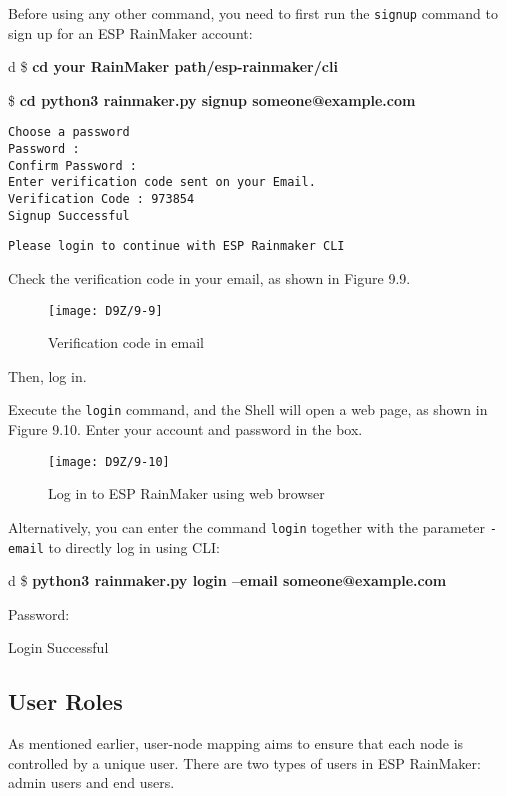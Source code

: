 \documentclass[a4paper,12pt]{book}
\begin{document}
Before using any other command, you need to first run the \verb|signup| command to sign up for an ESP RainMaker account:

\begin{codebloc}
\begin{tabular}{d}
\$ \textbf{cd {your RainMaker path}/esp-rainmaker/cli}

\$ \textbf{cd python3 rainmaker.py signup someone@example.com}
\begin{verbatim}
Choose a password
Password :
Confirm Password :
Enter verification code sent on your Email.
Verification Code : 973854
Signup Successful
\end{verbatim}
\verb|Please login to continue with ESP Rainmaker CLI|
\end{tabular}
\end{codebloc}

Check the verification code in your email, as shown in Figure 9.9.

\begin{figure}[!h]
    \centering
    \texttt{[image: D9Z/9-9]}
    \caption{Verification code in email}
\end{figure}

Then, log in.

Execute the \verb|login| command, and the Shell will open a web page, as shown in Figure 9.10. Enter your account and password in the box.

\begin{figure}[!h]
    \centering
    \texttt{[image: D9Z/9-10]}
    \caption{Log in to ESP RainMaker using web browser}
\end{figure}

Alternatively, you can enter the command \verb|login| together with the parameter \verb|-email| to directly log in using CLI:

\begin{codebloc}
\begin{tabular}{d}
\$ \textbf{python3 rainmaker.py login --email someone@example.com}

Password:

Login Successful
\end{tabular}
\end{codebloc}

\subsection{User Roles}
As mentioned earlier, user-node mapping aims to ensure that each node is controlled by a unique user. There are two types of users in ESP RainMaker: admin users and end users.
\end{document}
